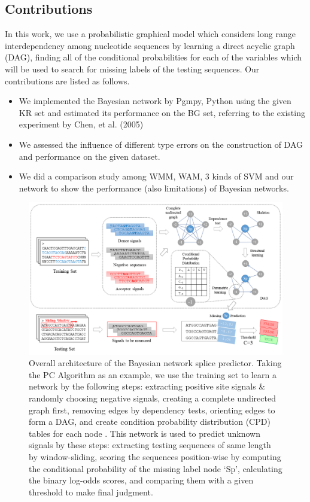 \documentclass[journal,twoside]{IEEEtran}
\begin{document}
\subsection{Contributions}\label{1.2}

In this work, we use a probabilistic graphical model which considers long range interdependency among nucleotide sequences by learning a direct acyclic graph (DAG), finding all of the conditional probabilities for each of the variables which will be used to search for missing labels of the testing sequences. Our contributions are listed as follows. 

\begin{itemize}
\item We implemented the Bayesian network by Pgmpy, Python \cite{ankan2015pgmpy} using the given KR set and estimated its performance on the BG set, referring to the existing experiment by Chen, et al. (2005) \cite{chen2005prediction}
\item We assessed the influence of different type \uppercase\expandafter{} errors on the construction of DAG and performance on the given dataset. 
\item We did a comparison study among WMM, WAM, 3 kinds of SVM and our network to show the performance (also limitations) of Bayesian networks. 
\end{itemize}

\begin{figure}[htbp]
\centerline{\includegraphics[scale=0.5]{Pics/BN.png}}
\caption{Overall architecture of the Bayesian network splice predictor. Taking the PC Algorithm \cite{spirtes1991algorithm} as an example, we use the training set to learn a network by the following steps: extracting positive site signals \& randomly choosing negative signals, creating a complete undirected graph first, removing edges by dependency tests, orienting edges to form a DAG, and create condition probability distribution (CPD) tables for each node \cite{neapolitan2004learning}. This network is used to predict unknown signals by these steps: extracting testing sequences of same length by window-sliding, scoring the sequences position-wise by computing the conditional probability of the missing label node `Sp', calculating the binary log-odds scores, and comparing them with a given threshold to make final judgment. }
\label{fig2}
\end{figure}
\end{document}
